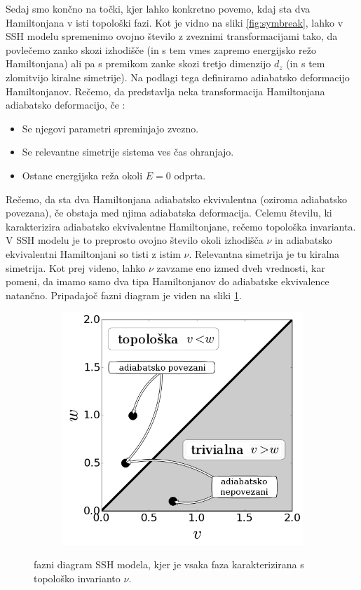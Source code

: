 Sedaj smo končno na točki, kjer lahko konkretno povemo, kdaj sta dva Hamiltonjana v isti topološki fazi.
Kot je vidno na sliki \ref{fig:symbreak}, lahko v SSH modelu spremenimo ovojno število z zveznimi transformacijami tako, da povlečemo zanko skozi izhodišče (in s tem vmes zapremo energijsko režo Hamiltonjana) ali pa s premikom zanke skozi tretjo dimenzijo $d_z$ (in s tem zlomitvijo kiralne simetrije). Na podlagi tega definiramo adiabatsko deformacijo Hamiltonjanov.
Rečemo, da predstavlja neka transformacija Hamiltonjana adiabatsko deformacijo, če \cite{madzar}:
\begin{itemize}
\item Se njegovi parametri spreminjajo zvezno.
\item Se relevantne simetrije sistema ves čas ohranjajo.
\item Ostane energijska reža okoli $E=0$ odprta.
\end{itemize}
\begin{multicols}{2}
Rečemo, da sta dva Hamiltonjana adiabatsko ekvivalentna (oziroma adiabatsko povezana), če obstaja med njima adiabatska deformacija.
Celemu številu, ki karakterizira adiabatsko ekvivalentne Hamiltonjane, rečemo topološka invarianta. V SSH modelu je to preprosto ovojno število okoli izhodišča $\nu$ in adiabatsko ekvivalentni Hamiltonjani so tisti z istim $\nu$. Relevantna simetrija je tu kiralna simetrija. Kot prej videno, lahko $\nu$ zavzame eno izmed dveh vrednosti, kar pomeni, da imamo samo dva tipa Hamiltonjanov do adiabatske ekvivalence natančno. Pripadajoč fazni diagram je viden na sliki \ref{fig:phasediag}.

\begin{figure}[H]
\centering
\begin{subfigure}{.5\textwidth}
\includegraphics[width=\linewidth]{Figures/PhaseDiag.png}
\end{subfigure}
\caption{fazni diagram SSH modela, kjer je vsaka faza karakterizirana s topološko invarianto $\nu$.}
\label{fig:phasediag}
\end{figure}
\end{multicols}

